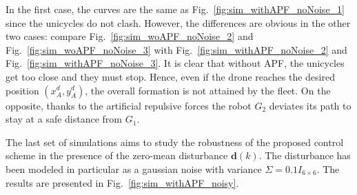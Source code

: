 \documentclass{ifacconf}
\begin{document}
In the first case, the curves are the same as Fig.~\ref{fig:sim_withAPF_noNoise_1} since 
the unicycles do not clash.
However, the differences are obvious in the other two cases: compare
Fig.~\ref{fig:sim_woAPF_noNoise_2} and Fig.~\ref{fig:sim_woAPF_noNoise_3} with
Fig.~\ref{fig:sim_withAPF_noNoise_2} and Fig.~\ref{fig:sim_withAPF_noNoise_3}.
It is clear  that without APF, the unicycles get too close and they must stop.
Hence, even if the drone reaches the desired position $(x^d_A, y^d_A)$, 
the overall formation is not attained by the fleet.
On the opposite, thanks to the artificial repulsive forces the robot $G_2$ 
deviates its path to stay at a safe distance from $G_1$.


The last set of simulations aims to study the robustness of the proposed control 
scheme in the presence of the zero-mean disturbance $\boldsymbol{d}(k)$.
The disturbance has been modeled in particular 
as a gaussian noise with variance $\Sigma = 0.1 I_{6\times6}$.
The results are presented in Fig.~\ref{fig:sim_withAPF_noisy}.
\end{document}
